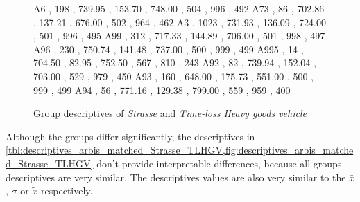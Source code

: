 \begin{figure}[ht!]
\begin{minipage}{0.55\textwidth}
{			A6   , 198  , 739.95 , 153.70 , 748.00 , 504 , 996 , 492 
			A73  , 86   , 702.86 , 137.21 , 676.00 , 502 , 964 , 462 
			A3   , 1023 , 731.93 , 136.09 , 724.00 , 501 , 996 , 495 
			A99  , 312  , 717.33 , 144.89 , 706.00 , 501 , 998 , 497 
			A96  , 230  , 750.74 , 141.48 , 737.00 , 500 , 999 , 499 
			A995 , 14   , 704.50 , 82.95  , 752.50 , 567 , 810 , 243 
			A92  , 82   , 739.94 , 152.04 , 703.00 , 529 , 979 , 450 
			A93  , 160  , 648.00 , 175.73 , 551.00 , 500 , 999 , 499 
			A94  , 56   , 771.16 , 129.38 , 799.00 , 559 , 959 , 400 
		}\data
		\pgfplotstablesort[sort key=mean, sort cmp=float >]{\datasorted}{\data}
		\tiny
		\centering
		\label{fig:descriptives_arbis_matched_Strasse_TLHGV}
	\end{minipage}%
	\caption{Group descriptives of \textit{Strasse} and \textit{Time-loss Heavy goods vehicle}}
\end{figure}
Although the groups differ significantly, the descriptives in \cref{tbl:descriptives_arbis_matched_Strasse_TLHGV,fig:descriptives_arbis_matched_Strasse_TLHGV} don't provide interpretable differences, because all groups descriptives are very similar. The descriptives values are also very similar to the $\bar{x}$, $\sigma$ or $\tilde{x}$ respectively.

 

